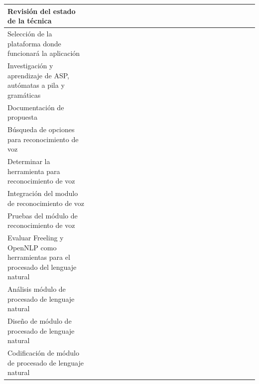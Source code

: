 \documentclass[final,12pt]{article}
\begin{document}
\begin{table}
{\begin{tabular}{|p{4cm}|c|c|c|c|c|c|c|c|c|c|c|c|c|c|c|c|c|c|c|c|c|c|c|c}
	Revisión del estado de la técnica&\checkmark 
	&\checkmark  &\checkmark  &\checkmark  &\checkmark  &\checkmark  &  &  &  &  &  &  &  &  &  &  &  &  &  &  &  &  &\\  
	\hline 
	Selección de la plataforma donde funcionará la aplicación&  &  &  &\checkmark  &\checkmark  &\checkmark  &  &  &  &  &  &  &  &  &  &  &  &  &  &  &  &  &\\ 
	\hline 
	Investigación y aprendizaje de ASP, autómatas a pila y gramáticas&  &  &\checkmark  &\checkmark  &\checkmark  &\checkmark  &\checkmark  &\checkmark  &\checkmark  &\checkmark  &\checkmark  &\checkmark  &  &  &  &  &  &  &  &  &  &  &\\ 
	\hline 
	Documentación de propuesta&  &  &  &  &\checkmark  &\checkmark  &\checkmark  &\checkmark  &\checkmark  &\checkmark  &\checkmark  &\checkmark  &\checkmark  &\checkmark  &\checkmark  &\checkmark  &\checkmark  &\checkmark  &\checkmark  &\checkmark  &\checkmark  &\checkmark  &\checkmark\\ 
	\hline 
	Búsqueda de opciones para reconocimiento de voz&  &  &  &  &\checkmark  &\checkmark  &\checkmark  &  &  &  &  &  &  &  &  &  &  &  &  &  &  &  &\\ 
	\hline 
	Determinar la herramienta para reconocimiento de voz&  &  &  &  &\checkmark  &\checkmark  &  &  &  &  &  &  &  &  &  &  &  &  &  &  &  &  &\\ 
	\hline 
	Integración del modulo de reconocimiento de voz&  &  &  &  &  &\checkmark  &\checkmark  &  &  &  &  &  &  &  &  &  &  &  &  &  &  &  &\\ 
	\hline 
	Pruebas del módulo de reconocimiento de voz&  &  &  &  &  &  &  &\checkmark  &  &  &  &  &  &  &  &  &  &  &  &  &  &  &\\ 
	\hline  
	Evaluar Freeling y OpenNLP como herramientas para el procesado del lenguaje natural&  &  &  &  &  &  &  &  &\checkmark  &  &  &  &  &  &  &  &  &  &  &  &  &  &\\ 
	 \hline 
	Análisis módulo de procesado de lenguaje natural&  &  &  &  &  &  &  &  &   &\checkmark  &\checkmark  &\checkmark  &  &  &  &  &  &  &  &  &  &  &\\ 
	\hline
	Diseño de módulo de procesado de lenguaje natural&  &  &  &  &  &  &  &  &   &  &  &  & \checkmark &\checkmark  &\checkmark  &  &  &  &  &  &  &  &\\ 
	\hline  
	Codificación de módulo de procesado de lenguaje natural&  &  &  &  &  &  &  &  &   &  &  &  &  &  &  &\checkmark  &\checkmark  &\checkmark  &  &  &  &  &\\ 

\end{tabular}}
\end{table}
\end{document}

